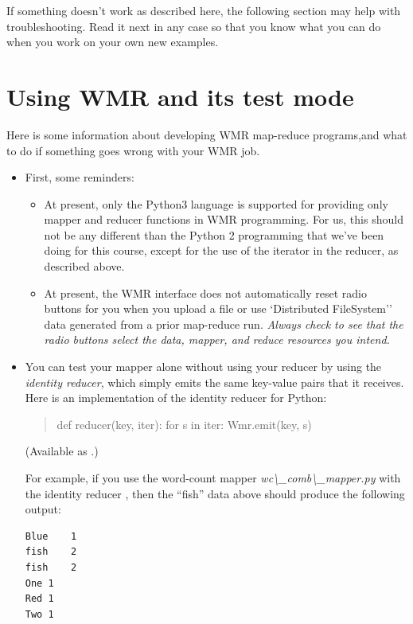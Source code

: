 \documentclass[letterpaper,10pt,openany,oneside]{sphinxmanual}
\begin{document}
If something doesn't work as described here, the following section
may help with troubleshooting. Read it next in any case so that you
know what you can do when you work on your own new examples.


\section{Using WMR and its test mode}
\label{wmr_py/wmr_py:using-wmr-and-its-test-mode}
Here is some information about developing WMR map-reduce
programs,and what to do if something goes wrong with your WMR job.
\begin{itemize}
\item {} 
First, some reminders:
\begin{itemize}
\item {} 
At present, only the Python3 language is supported for providing
only mapper and reducer functions in WMR programming. For us, this
should not be any different than the Python 2 programming that
we've been doing for this course, except for the use of the
iterator in the reducer, as described above.

\item {} 
At present, the WMR interface does not automatically reset radio
buttons for you when you upload a file or use {}`Distributed
FileSystem'' data generated from a prior map-reduce run.
\emph{Always check to see that the radio buttons select the data, mapper, and reduce resources you intend.}

\end{itemize}

\item {} 
You can test your mapper alone without using your reducer by
using the \emph{identity reducer}, which simply emits the same key-value
pairs that it receives. Here is an implementation of the identity
reducer for Python:
\begin{quote}

def reducer(key, iter): for s in iter: Wmr.emit(key, s)
\end{quote}

(Available as .)

For example, if you use the word-count mapper
\emph{wc\textbackslash{}\_comb\textbackslash{}\_mapper.py} with the identity reducer
, then the ``fish'' data above should produce the
following output:

\begin{Verbatim}[commandchars=\\\{\}]
Blue    1
fish    2
fish    2
One 1
Red 1
Two 1
\end{Verbatim}


\end{itemize}
\end{document}
